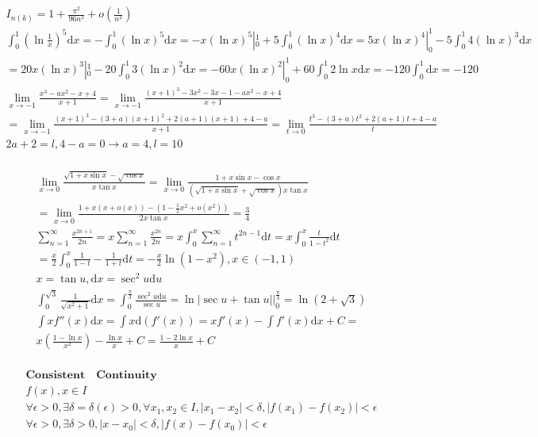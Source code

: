 \documentclass{article}
\begin{document}
\begin{align*}
    I_{n(k)} = 1 + \frac{\pi^{2}}{96n^2} + o(\frac{1}{n^2}) \\ 
    \int_{0}^{1}\left(\ln\frac{1}{x}\right)^5\mathrm{d}x= -\int_{0}^{1}(\ln x)^5\mathrm{d}x = -x(\ln x)^5|_{0}^{1} + 5 \int_{0}^{1} \left(\ln x\right)^4 \mathrm{d}x = 5x(\ln x)^4|_{0}^{1} - 5\int_{0}^{1} 4 (\ln x)^3\mathrm{d}x \\ 
    = 20x(\ln x)^3 |_{0}^{1} - 20\int_{0}^{1} 3(\ln x)^2\mathrm{d}x = -60x(\ln x)^2|_{0}^{1} + 60\int_{0}^{1} 2\ln x\mathrm{d}x = -120\int_{0}^{1} \mathrm{d}x = -120 \\ 
    \lim_{x \to -1} \frac{x^3-ax^2-x+4}{x+1} = \lim_{x \to -1} \frac{(x+1)^3-3x^2-3x-1-ax^2-x+4}{x+1} \\ 
    = \lim_{x \to -1} \frac{(x+1)^3-(3+a)(x+1)^2 +2(a+1)(x+1)+4-a}{x+1} = \lim_{t \to 0}\frac{t^3-(3+a)t^2+2(a+1)t+4-a}{t} \\
    2a+2=l,4-a=0 \rightarrow a=4,l=10 \\
\end{align*}
    

\begin{align*}
    \lim_{x \to 0}\frac{\sqrt{1+x\sin x}-\sqrt{\cos x}}{x\tan x} = \lim_{x \to 0} \frac{1+x\sin x-\cos x}{(\sqrt{1+x\sin x}+\sqrt{\cos x})x\tan x}  \\
    = \lim_{x \to 0} \frac{1+x(x+o(x))-\left(1-\frac{1}{2}x^2+o(x^2)\right)}{2x\tan x} = \frac{3}{4} \\
    \sum_{n=1}^{\infty} \frac{x^{2n+1}}{2n} = x\sum_{n=1}^{\infty} \frac{x^{2n}}{2n} = x\int_{0}^{x} \sum_{n=1}^{\infty}t^{2n-1}\mathrm{d}t = x\int_{0}^{x} \frac{t}{1-t^2}\mathrm{d}t \\
    =  \frac{x}{2} \int_{0}^{x} \frac{1}{1-t} - \frac{1}{1+t} \mathrm{d}t = -\frac{x}{2} \ln(1-x^2) ,x \in (-1,1) \\
    x = \tan u ,\mathrm{d}x = \sec^2 u\mathrm{d}u \\ 
    \int_{0}^{\sqrt{3}}\frac{1}{\sqrt{x^2+1}}\mathrm{d}x = \int_{0}^{\frac{\pi}{3}}\frac{\sec^2 u\mathrm{d}u}{\sec u} = \ln\left| \sec u + \tan u \right| |_{0}^{\frac{\pi}{3}} = \ln(2+\sqrt{3}) \\
    \int xf''(x)\mathrm{d}x = \int x\mathrm{d}(f'(x)) = xf'(x)-\int f'(x)\mathrm{d}x +C = \\
    x\left(\frac{1-\ln x}{x^2}\right)-\frac{\ln x}{x} + C = \frac{1-2\ln x}{x} + C\\
\end{align*}

\begin{align*}
    \mathbf{Consistent \quad Continuity} \\
    f(x) , x \in I \\
    \forall \epsilon > 0 ,\exists \delta  = \delta(\epsilon) > 0 , \forall x_{1},x_{2} \in I , |x_{1}-x_{2}| < \delta , |f(x_{1})-f(x_{2})| < \epsilon \\
    \forall \epsilon > 0 ,\exists \delta > 0 ,|x-x_{0}| < \delta ,|f(x)-f(x_{0})| < \epsilon\\ 
\end{align*}
\end{document}
